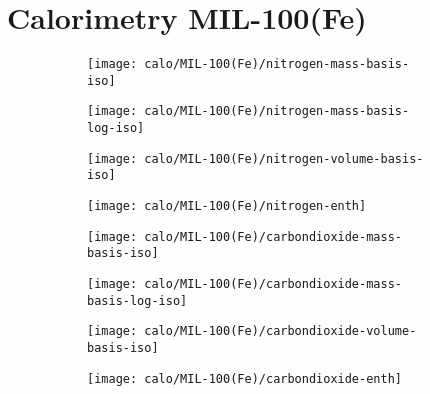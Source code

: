 
\section{Calorimetry MIL-100(Fe)}

\begin{figure}[H]
    \centering

    \begin{subfigure}{0.25\linewidth}
        \texttt{[image: calo/MIL-100(Fe)/nitrogen-mass-basis-iso]}%
        \label{appx:fig:shaping:mil100n2mass}
    \end{subfigure}%
    \begin{subfigure}{0.25\linewidth}
        \texttt{[image: calo/MIL-100(Fe)/nitrogen-mass-basis-log-iso]}%
        \label{appx:fig:shaping:mil100n2masslog}
    \end{subfigure}%
    \begin{subfigure}{0.25\linewidth}
        \texttt{[image: calo/MIL-100(Fe)/nitrogen-volume-basis-iso]}%
        \label{appx:fig:shaping:mil100n2volume}
    \end{subfigure}%
    \begin{subfigure}{0.25\linewidth}
        \texttt{[image: calo/MIL-100(Fe)/nitrogen-enth]}%
        \label{appx:fig:shaping:mil100n2enth}
    \end{subfigure}%
    
    \begin{subfigure}{0.25\textwidth}
        \texttt{[image: calo/MIL-100(Fe)/carbondioxide-mass-basis-iso]}%
        \label{appx:fig:shaping:mil100co2mass}
    \end{subfigure}%
    \begin{subfigure}{0.25\textwidth}
        \texttt{[image: calo/MIL-100(Fe)/carbondioxide-mass-basis-log-iso]}%
        \label{appx:fig:shaping:mil100co2masslog}
    \end{subfigure}%
    \begin{subfigure}{0.25\textwidth}
        \texttt{[image: calo/MIL-100(Fe)/carbondioxide-volume-basis-iso]}%
        \label{appx:fig:shaping:mil100co2volume}
    \end{subfigure}%
    \begin{subfigure}{0.25\textwidth}
        \texttt{[image: calo/MIL-100(Fe)/carbondioxide-enth]}%
        \label{appx:fig:shaping:mil100co2enth}
    \end{subfigure}%


\end{figure}

